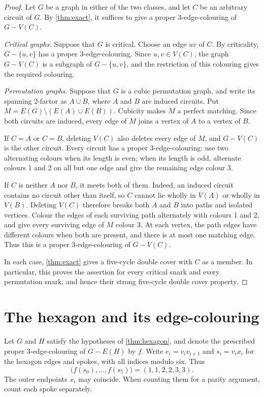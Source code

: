 \documentclass[justified,notoc,twoside,nobib,nofonts]{tufte-handout}
\begin{document}
\criticalpermutation*
\begin{proof}
Let $G$ be a graph in either of the two classes, and let $C$ be an
arbitrary circuit of $G$. By \cref{thm:exact}, it suffices to give a
proper 3-edge-colouring of $G-V(C)$.

\emph{Critical graphs.} Suppose that $G$ is critical. Choose an edge
$uv$ of $C$. By criticality, $G-\{u,v\}$ has a proper
3-edge-colouring. Since $u,v\in V(C)$, the graph $G-V(C)$ is a
subgraph of $G-\{u,v\}$, and the restriction of this colouring gives
the required colouring.

\emph{Permutation graphs.} Suppose that $G$ is a cubic permutation
graph, and write its spanning 2-factor as $A\cup B$, where $A$ and
$B$ are induced circuits. Put $M=E(G)\setminus(E(A)\cup E(B))$.
Cubicity makes $M$ a perfect matching. Since both circuits are
induced, every edge of $M$ joins a vertex of $A$ to a vertex of $B$.

If $C=A$ or $C=B$, deleting $V(C)$ also deletes every edge of $M$,
and $G-V(C)$ is the other circuit. Every circuit has a proper
3-edge-colouring: use two alternating colours when its length is
even; when its length is odd, alternate colours 1 and 2 on all but
one edge and give the remaining edge colour 3.

If $C$ is neither $A$ nor $B$, it meets both of them. Indeed, an
induced circuit contains no circuit other than itself, so $C$ cannot
lie wholly in $V(A)$ or wholly in $V(B)$. Deleting $V(C)$ therefore
breaks both $A$ and $B$ into paths and isolated vertices. Colour the
edges of each surviving path alternately with colours 1 and 2, and
give every surviving edge of $M$ colour 3. At each vertex, the path
edges have different colours when both are present, and there is at
most one matching edge. Thus this is a proper 3-edge-colouring of
$G-V(C)$.

In each case, \cref{thm:exact} gives a five-cycle double cover with
$C$ as a member. In particular, this proves the assertion for
every critical snark and every permutation snark, and hence their
strong five-cycle double cover property.
\end{proof}

\section{The hexagon and its edge-colouring}\label{sec:hexagon}

Let $G$ and $H$ satisfy the hypotheses of \cref{thm:hexagon}, and
denote the prescribed proper 3-edge-colouring of $G-E(H)$ by $f$.
Write $e_i=v_iv_{i+1}$ and $s_i=v_ix_i$ for the hexagon edges and
spokes, with all indices modulo six. Thus
\begin{equation}\label{eq:hexword}
  \bigl(f(s_0),\dots,f(s_5)\bigr)=(1,1,2,2,3,3).
\end{equation}
The outer endpoints $x_i$ may coincide. When counting them for a
parity argument, count each spoke separately.
\end{document}
